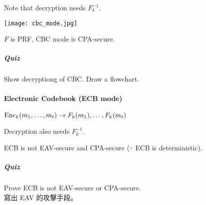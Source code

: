 Note that decryption needs \(F_k^{-1}\).

\begin{center}
	\texttt{[image: cbc\_mode.jpg]}
\end{center}

\begin{theorem}
	\(F\) is PRF, CBC mode is CPA-secure.
\end{theorem}

\subparagraph{Quiz}

Show decryptiong of CBC. Draw a flowchart.


\paragraph{Electronic Codebook (ECB mode)}

\(\operatorname{Enc}_k(m_1, \ldots, m_t) \rightarrow F_k(m_1), \ldots, F_k(m_t)\)

Decryption also needs \(F_k^{-1}\).

ECB is not EAV-secure and CPA-secure (\(\because\) ECB is deterministic).

\subparagraph{Quiz}

Prove ECB is not EAV-secure or CPA-secure. \\
寫出 EAV 的攻擊手段。